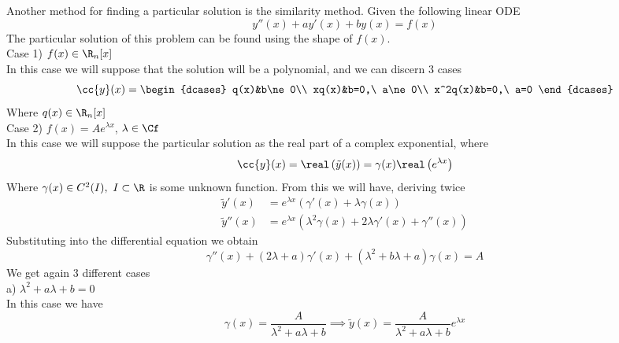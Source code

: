 \documentclass[../mmf.tex]{subfiles}
\begin{document}
\begin{mtd}
	Another method for finding a particular solution is the similarity method. Given the following linear ODE
	\begin{equation*}
		y''(x)+ay'(x)+by(x)=f(x)
	\end{equation*}
	The particular solution of this problem can be found using the shape of $f(x)$.\\
	Case 1) $f(x)\in\R_n[x]$\\
	In this case we will suppose that the solution will be a polynomial, and we can discern 3 cases
	\begin{equation*}
		\cc{y}(x)=\begin{dcases}
			q(x)&b\ne0\\
			xq(x)&b=0,\ a\ne0\\
			x^2q(x)&b=0,\ a=0
		\end{dcases}
	\end{equation*}
	Where $q(x)\in\R_n[x]$\\
	Case 2) $f(x)=Ae^{\lambda x}$, $\lambda\in\Cf$\\
	In this case we will suppose the particular solution as the real part of a complex exponential, where
	\begin{equation*}
		\cc{y}(x)=\real\left( \tilde{y}(x) \right)=\gamma(x)\real\left( e^{\lambda x} \right)
	\end{equation*}
	Where $\gamma(x)\in C^2(I),\ I\subset\R$ is some unknown function. From this we will have, deriving twice
	\begin{equation*}
		\begin{aligned}
			\tilde{y}'(x)&=e^{\lambda x}\left( \gamma'(x)+\lambda\gamma(x) \right)\\
			\tilde{y}''(x)&=e^{\lambda x}\left( \lambda^2\gamma(x)+2\lambda\gamma'(x)+\gamma''(x) \right)
		\end{aligned}
	\end{equation*}
	Substituting into the differential equation we obtain
	\begin{equation*}
		\gamma''(x)+(2\lambda+a)\gamma'(x)+(\lambda^2+b\lambda+a)\gamma(x)=A
	\end{equation*}
	We get again 3 different cases\\
	a) $\lambda^2+a\lambda+b=0$\\
	In this case we have
	\begin{equation*}
		\gamma(x)=\frac{A}{\lambda^2+a\lambda+b}\implies{} \tilde{y}(x)=\frac{A}{\lambda^2+a\lambda+b}e^{\lambda x}
	\end{equation*}

\end{mtd}
\end{document}
